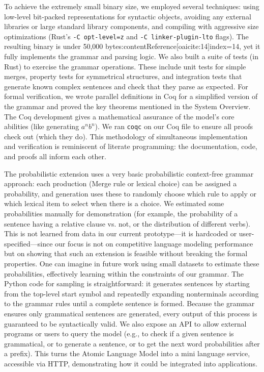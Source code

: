 \documentclass[11pt]{article}
\begin{document}
To achieve the extremely small binary size, we employed several techniques: using low-level bit-packed representations for syntactic objects, avoiding any external libraries or large standard library components, and compiling with aggressive size optimizations (Rust's \texttt{-C opt-level=z} and \texttt{-C linker-plugin-lto} flags). The resulting binary is under 50,000 bytes:contentReference[oaicite:14]{index=14}, yet it fully implements the grammar and parsing logic. We also built a suite of tests (in Rust) to exercise the grammar operations. These include unit tests for simple merges, property tests for symmetrical structures, and integration tests that generate known complex sentences and check that they parse as expected. For formal verification, we wrote parallel definitions in Coq for a simplified version of the grammar and proved the key theorems mentioned in the System Overview. The Coq development gives a mathematical assurance of the model's core abilities (like generating $a^n b^n$). We ran \texttt{coqc} on our Coq file to ensure all proofs check out (which they do). This methodology of simultaneous implementation and verification is reminiscent of literate programming: the documentation, code, and proofs all inform each other.

The probabilistic extension uses a very basic probabilistic context-free grammar approach: each production (Merge rule or lexical choice) can be assigned a probability, and generation uses these to randomly choose which rule to apply or which lexical item to select when there is a choice. We estimated some probabilities manually for demonstration (for example, the probability of a sentence having a relative clause vs. not, or the distribution of different verbs). This is not learned from data in our current prototype—it is hardcoded or user-specified—since our focus is not on competitive language modeling performance but on showing that such an extension is feasible without breaking the formal properties. One can imagine in future work using small datasets to estimate these probabilities, effectively learning within the constraints of our grammar. The Python code for sampling is straightforward: it generates sentences by starting from the top-level start symbol and repeatedly expanding nonterminals according to the grammar rules until a complete sentence is formed. Because the grammar ensures only grammatical sentences are generated, every output of this process is guaranteed to be syntactically valid. We also expose an API to allow external programs or users to query the model (e.g., to check if a given sentence is grammatical, or to generate a sentence, or to get the next word probabilities after a prefix). This turns the Atomic Language Model into a mini language service, accessible via HTTP, demonstrating how it could be integrated into applications.
\end{document}
